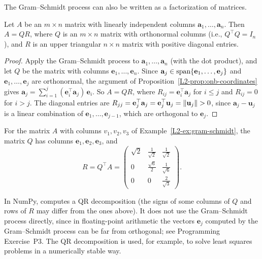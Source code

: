 The Gram--Schmidt process can also be written as a factorization of matrices.

\begin{proposition}[QR decomposition]\label{L2-prop:qr}
    Let $A$ be an $m \times n$ matrix with linearly independent columns $\mathbf{a}_1, \ldots, \mathbf{a}_n$. Then $A = QR$, where $Q$ is an $m \times n$ matrix with orthonormal columns (i.e., $Q^\top Q = I_n$), and $R$ is an upper triangular $n \times n$ matrix with positive diagonal entries.
\end{proposition}

\begin{proof}
    Apply the Gram--Schmidt process to $\mathbf{a}_1, \ldots, \mathbf{a}_n$ (with the dot product), and let $Q$ be the matrix with columns $\mathbf{e}_1, \ldots, \mathbf{e}_n$. Since $\mathbf{a}_j \in \operatorname{span}\{\mathbf{e}_1, \ldots, \mathbf{e}_j\}$ and $\mathbf{e}_1, \ldots, \mathbf{e}_j$ are orthonormal, the argument of Proposition~\ref{L2-prop:onb-coordinates} gives $\mathbf{a}_j = \sum_{i=1}^{j} (\mathbf{e}_i^\top \mathbf{a}_j)\, \mathbf{e}_i$. So $A = QR$, where $R_{ij} = \mathbf{e}_i^\top \mathbf{a}_j$ for $i \leq j$ and $R_{ij} = 0$ for $i > j$. The diagonal entries are $R_{jj} = \mathbf{e}_j^\top \mathbf{a}_j = \mathbf{e}_j^\top \mathbf{u}_j = \lVert \mathbf{u}_j \rVert > 0$, since $\mathbf{a}_j - \mathbf{u}_j$ is a linear combination of $\mathbf{e}_1, \ldots, \mathbf{e}_{j-1}$, which are orthogonal to $\mathbf{e}_j$.
\end{proof}

\begin{example}
    For the matrix $A$ with columns $v_1, v_2, v_3$ of Example~\ref{L2-ex:gram-schmidt}, the matrix $Q$ has columns $\mathbf{e}_1, \mathbf{e}_2, \mathbf{e}_3$, and
    \[R = Q^\top A = \begin{pmatrix} \sqrt{2} & \frac{1}{\sqrt{2}} & \frac{1}{\sqrt{2}} \\ 0 & \frac{\sqrt{6}}{2} & \frac{1}{\sqrt{6}} \\ 0 & 0 & \frac{2}{\sqrt{3}} \end{pmatrix}.\]
\end{example}

\begin{remark}
    In NumPy,  computes a QR decomposition (the signs of some columns of $Q$ and rows of $R$ may differ from the ones above). It does not use the Gram--Schmidt process directly, since in floating-point arithmetic the vectors $\mathbf{e}_j$ computed by the Gram--Schmidt process can be far from orthogonal; see Programming Exercise~P3. The QR decomposition is used, for example, to solve least squares problems in a numerically stable way.
\end{remark}

